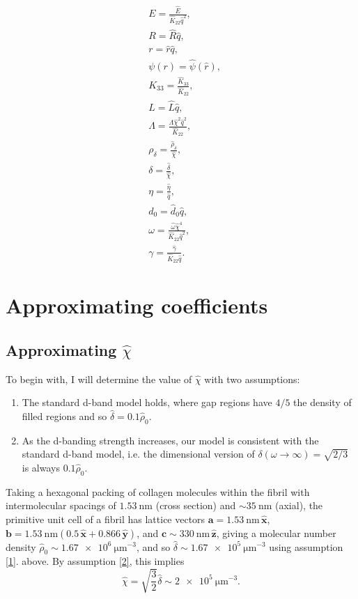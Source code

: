 \documentclass[12pt]{article}
\begin{document}
\begin{align}
&E=\frac{\hat{E}}{\hat{K}_{22}\hat{q}^2},\\
&R=\hat{R}\hat{q},\\
&r=\hat{r}\hat{q},\\
&\psi(r)=\hat{\psi}(\hat{r}),\\
&K_{33}=\frac{\hat{K}_{33}}{\hat{K}_{22}},\\
&L=\hat{L}\hat{q},\\
&\Lambda=\frac{\hat{\Lambda}\hat{\chi}^2\hat{q}^2}{\hat{K}_{22}},\label{eq:dimensionlessLambda}\\
&\rho_{\delta}=\frac{\hat{\rho}_{\delta}}{\hat{\chi}},\\
&\delta=\frac{\hat{\delta}}{\hat{\chi}},\\
&\eta=\frac{\hat{\eta}}{\hat{q}},\\
&d_0=\hat{d}_0\hat{q},\\
&\omega=\frac{\hat{\omega}\hat{\chi}^4}{\hat{K}_{22}\hat{q}^2},\label{eq:dimensionlessomega}\\
&\gamma=\frac{\hat{\gamma}}{\hat{K}_{22}\hat{q}}.
\end{align}
\section{Approximating coefficients}
\subsection{Approximating $\hat{\chi}$}
To begin with, I will determine the value of $\hat{\chi}$ with two assumptions: 
\begin{enumerate}
\item \label{1} The standard d-band model holds, where gap regions have $4/5$ the density of filled regions and so $\hat{\delta}=0.1\hat{\rho}_0$.
\item \label{2} As the d-banding strength increases, our model is consistent with the standard d-band model, i.e. the dimensional version of $\delta(\omega\to\infty)=\sqrt{2/3}$ is always $0.1\hat{\rho}_0$.
\end{enumerate}
Taking a hexagonal packing of collagen molecules within the fibril with intermolecular spacings of $\SI{1.53}{\nano\meter}$ (cross section) and $\sim\SI{35}{\nano\meter}$ (axial), the primitive unit cell of a fibril has lattice vectors $\bm{a}=\SI{1.53}{\nano\meter}\,\hat{\bm{x}}$, $\bm{b}=\SI{1.53}{\nano\meter}(0.5\,\hat{\bm{x}}+0.866\,\hat{\bm{y}})$, and $\bm{c}\sim\SI{330}{\nano\meter}\,\hat{\bm{z}}$, giving a molecular number density $\hat{\rho}_0\sim\SI{1.67e6}{\micro\meter^{-3}}$, and so $\hat{\delta}\sim\SI{1.67e5}{\micro\meter^{-3}}$ using assumption \ref{1}. above. By assumption \ref{2}, this implies
\begin{equation}\label{eq:chi}
\hat{\chi}=\sqrt{\frac{3}{2}}\hat{\delta}\sim\SI{2e5}{\micro\meter^{-3}}.
\end{equation}
\end{document}
